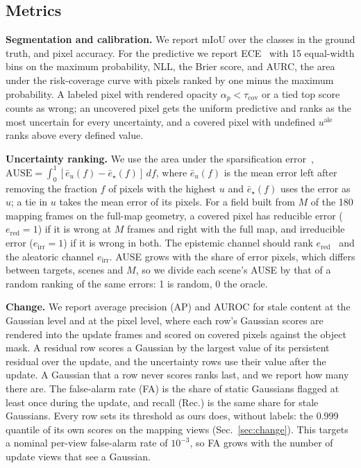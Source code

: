 \documentclass[journal]{IEEEtran}
\newcommand{\secref}[1]{Sec.~\mbox{\ref{#1}}}       %
\begin{document}
\subsection{Metrics}
\label{sec:metrics}
\textbf{Segmentation and calibration.} We report mIoU over the classes in the ground truth, and pixel accuracy. For the predictive we report ECE~\cite{guo2017calibration} with 15 equal-width bins on the maximum probability, NLL, the Brier score, and AURC, the area under the risk-coverage curve with pixels ranked by one minus the maximum probability. A labeled pixel with rendered opacity $\alpha_p<\tau_{\mathrm{cov}}$ or a tied top score counts as wrong; an uncovered pixel gets the uniform predictive and ranks as the most uncertain for every uncertainty, and a covered pixel with undefined $u^{\mathrm{ale}}$ ranks above every defined value.

\textbf{Uncertainty ranking.} We use the area under the sparsification error~\cite{ilg2018uncertainty}, $\mathrm{AUSE}=\int_0^1[\bar e_u(f)-\bar e_\star(f)]\,df$, where $\bar e_u(f)$ is the mean error left after removing the fraction $f$ of pixels with the highest $u$ and $\bar e_\star(f)$ uses the error as $u$; a tie in $u$ takes the mean error of its pixels. For a field built from $M$ of the 180 mapping frames on the full-map geometry, a covered pixel has reducible error ($e_{\mathrm{red}}=1$) if it is wrong at $M$ frames and right with the full map, and irreducible error ($e_{\mathrm{irr}}=1$) if it is wrong in both. The epistemic channel should rank $e_{\mathrm{red}}$~\cite{kendall2017uncertainties} and the aleatoric channel $e_{\mathrm{irr}}$. AUSE grows with the share of error pixels, which differs between targets, scenes and $M$, so we divide each scene's AUSE by that of a random ranking of the same errors: 1 is random, 0 the oracle.

\textbf{Change.} We report average precision (AP) and AUROC for stale content at the Gaussian level and at the pixel level, where each row's Gaussian scores are rendered into the update frames and scored on covered pixels against the object mask. A residual row scores a Gaussian by the largest value of its persistent residual over the update, and the uncertainty rows use their value after the update. A Gaussian that a row never scores ranks last, and we report how many there are. The false-alarm rate (FA) is the share of static Gaussians flagged at least once during the update, and recall (Rec.) is the same share for stale Gaussians. Every row sets its threshold as ours does, without labels: the 0.999 quantile of its own scores on the mapping views (\secref{sec:change}). This targets a nominal per-view false-alarm rate of $10^{-3}$, so FA grows with the number of update views that see a Gaussian.
\end{document}
